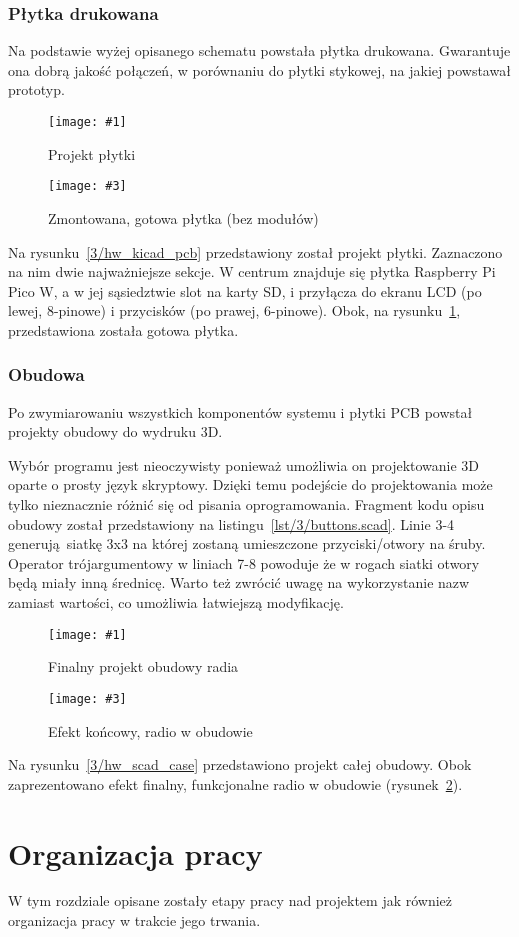 \documentclass[12pt]{report}
\newcommand{\imgintss}[5]{
	\begin{figure}[{#5}]
		\centering
		\begin{minipage}{.45\textwidth}
			\centering
			\texttt{[image: \#1]}
			\caption{#2}
			\label{#1}
		\end{minipage}%
		\hfill
		\begin{minipage}{.45\textwidth}
			\centering
			\texttt{[image: \#3]}
			\caption{#4}
			\label{#3}
		\end{minipage}
	\end{figure}
}
\newcommand{\imghss}[4]{\imgintss{#1}{#2}{#3}{#4}{H}}
\newcommand{\lstfile}[3]{
	\noindent
	\hspace{0.1\linewidth}
	\begin{minipage}{0.8\linewidth}
		
	\end{minipage}
	\vspace{0.3cm}
}
\begin{document}
		\subsection{Płytka drukowana}
			Na podstawie wyżej opisanego schematu powstała płytka drukowana. Gwarantuje ona dobrą jakość połączeń, w porównaniu do płytki stykowej, na jakiej powstawał prototyp.
		
			\imghss{3/hw_kicad_pcb}{Projekt płytki}{3/hw_pcb}{Zmontowana, gotowa płytka (bez modułów)}
			
			Na rysunku~\ref{3/hw_kicad_pcb} przedstawiony został projekt płytki. Zaznaczono na nim dwie najważniejsze sekcje. W centrum znajduje się płytka Raspberry Pi Pico W, a w jej sąsiedztwie slot na karty SD, i przyłącza do ekranu LCD (po lewej, 8-pinowe) i przycisków (po prawej, 6-pinowe). Obok, na rysunku~\ref{3/hw_pcb}, przedstawiona została gotowa płytka.
			
		\subsection{Obudowa}
			Po zwymiarowaniu wszystkich komponentów systemu i płytki PCB powstał projekty obudowy do wydruku 3D.
			
			\lstfile{scad}{Kod generujący otwory na przyciski i śruby montażowe}{lst/3/buttons.scad}
			
			Wybór programu jest nieoczywisty ponieważ umożliwia on projektowanie 3D oparte o prosty język skryptowy. Dzięki temu podejście do projektowania może tylko nieznacznie różnić się od pisania oprogramowania. Fragment kodu opisu obudowy został przedstawiony na listingu~\ref{lst/3/buttons.scad}. Linie 3-4 generują siatkę 3x3 na której zostaną umieszczone przyciski/otwory na śruby. Operator trójargumentowy w liniach 7-8 powoduje że w rogach siatki otwory będą miały inną średnicę. Warto też zwrócić uwagę na wykorzystanie nazw zamiast wartości, co umożliwia łatwiejszą modyfikację.
			
			\imghss{3/hw_scad_case}{Finalny projekt obudowy radia}{3/hw_case}{Efekt końcowy, radio w obudowie}
			
			Na rysunku~\ref{3/hw_scad_case} przedstawiono projekt całej obudowy. Obok zaprezentowano efekt finalny, funkcjonalne radio w obudowie (rysunek~\ref{3/hw_case}).
			
\chapter{Organizacja pracy}
	W tym rozdziale opisane zostały etapy pracy nad projektem jak również organizacja pracy w trakcie jego trwania.
	
\end{document}
